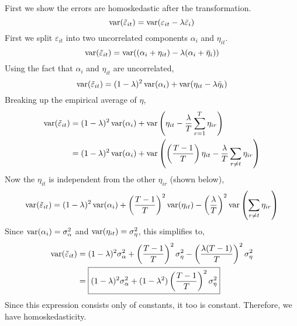 \documentclass[12pt,twoside]{article}
\begin{document}
\begin{problems}
\begin{problemparts}
First we show the errors are homoskedastic after the transformation. 
$$ \operatorname{var}(\tilde{\varepsilon}_{it}) = \operatorname{var}(\varepsilon_{it} - \lambda
\bar{\varepsilon}_i) $$
First we split $\varepsilon_{it}$ into two uncorrelated components $\alpha_i$
and $\eta_{it}$.
$$ \operatorname{var}(\tilde{\varepsilon}_{it}) = \operatorname{var}((\alpha_i + \eta_{it}) - \lambda
(\alpha_i + \bar{\eta}_i) ) $$
Using the fact that $\alpha_i$ and $\eta_{it}$ are uncorrelated,
$$ \operatorname{var}(\tilde{\varepsilon}_{it}) = (1 - \lambda)^2 \operatorname{var}(\alpha_i) +
\operatorname{var}(\eta_{it} - \lambda \bar{\eta}_i) $$
Breaking up the empirical average of $\eta$,
\begin{align*}
    \operatorname{var}(\tilde{\varepsilon}_{it}) &= (1 - \lambda)^2 \operatorname{var}(\alpha_i) +
    \operatorname{var}\left(\eta_{it} - \frac{\lambda}{T} \sum_{r = 1}^T \eta_{ir}\right) \\
    &= (1 - \lambda)^2 \operatorname{var}(\alpha_i) + \operatorname{var}\left(\left(\frac{T -
    1}{T}\right) \eta_{it} - \frac{\lambda}{T} \sum_{r \neq t}
    \eta_{ir}\right)
\end{align*}
Now the $\eta_{it}$ is independent from the other $\eta_{ir}$ (shown below),
$$ \operatorname{var}(\tilde{\varepsilon}_{it}) = (1 - \lambda)^2 \operatorname{var}(\alpha_i) +
\left(\frac{T - 1}{T}\right)^2\operatorname{var}(\eta_{it}) -
\left(\frac{\lambda}{T}\right)^2\operatorname{var}\left(\sum_{r \neq t}\eta_{ir}\right) $$
Since $\operatorname{var}(\alpha_i) = \sigma_\alpha^2$ and $\operatorname{var}(\eta_{it}) =
\sigma_\eta^2$, this simplifies to,
\begin{align*}
    \operatorname{var}(\tilde{\varepsilon}_{it}) &= (1 - \lambda)^2 \sigma_\alpha^2 +
    \left(\frac{T - 1}{T}\right)^2\sigma_\eta^2 - \left(\frac{\lambda(T -
    1)}{T}\right)^2 \sigma_\eta^2 \\
    &= \boxed{(1 - \lambda)^2 \sigma_\alpha^2 + (1 - \lambda^2) \left(\frac{T
    - 1}{T}\right)^2 \sigma_\eta^2}
\end{align*}
Since this expression consists only of constants, it too is constant.
Therefore, we have homoskedasticity.


\end{problemparts}
\end{problems}
\end{document}
